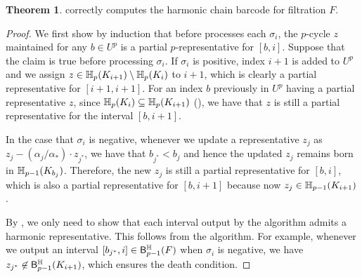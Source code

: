\documentclass[10pt,a4paper]{amsart}
\newcommand {\mm}[1] {\ifmmode{#1}\else{\mbox{\(#1\)}}\fi}
\newcommand{\har}           {\mm{\mathbb{H}}}
\newcommand{\hcb}{{harmonic chain barcode}}
\theoremstyle{definition}
\newcommand{\filt}{F}
\newcommand{\fsimp}{\sigma}
\newcommand{\hbarc}{\mathsf{B}^\har}
\newcommand{\aG}{\alpha}
\newtheorem{theorem}{Theorem}
\theoremstyle{remark}
\begin{document}
\begin{theorem}
 correctly computes the {\hcb} for filtration $\filt$.
\end{theorem}
\begin{proof}
We first show by induction that before  processes each $\fsimp_i$, the $p$-cycle $z$ maintained for any $b\in U^p$ is a partial $p$-representative for $[b,i]$.
Suppose that the claim is true before processing $\fsimp_i$.
If $\fsimp_i$ is positive, index $i+1$ is added to $U^p$ and we assign $z \in\har_p(K_{i+1})\setminus\har_p(K_i)$ to $i+1$, which is clearly a partial representative for $[i+1,i+1]$.
For an index $b$ previously in $U^p$ having a partial representative $z$, since $\har_p(K_i)\subseteq \har_p(K_{i+1})$ (), we have that $z$ is still a partial representative for the interval $[b,i+1]$.

In the case that $\fsimp_i$ is negative, whenever we update a representative $z_j$ as $z_j-(\aG_j/\aG_*)\cdot z_{j^*}$, we have that $b_{j^*}<b_j$ and hence the updated $z_j$ remains born in $\har_{p-1}(K_{b_j})$. Therefore, the new $z_j$ is still a partial representative for $[b,i]$, which is also a partial representative for $[b,i+1]$ because now $z_j\in\har_{p-1}(K_{i+1})$.

By , we only need to show that each interval output by the algorithm admits a harmonic representative.
This follows from the algorithm. 
For example, whenever we output an interval $[b_{j^*},i]\in\hbarc_{p-1}(\filt)$ when $\fsimp_i$ is negative, we have $z_{j^*}\not\in\hbarc_{p-1}(K_{i+1})$, which ensures the death condition.
\end{proof}


% 
\let\mbeg\[
\let\mend\]


\end{document}
